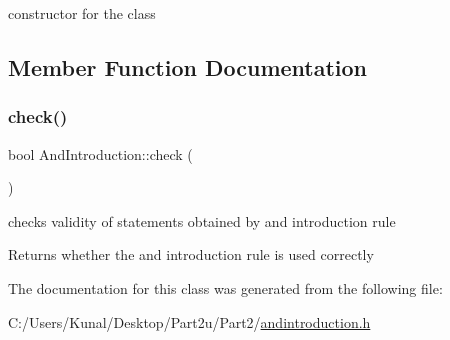 constructor for the class 



\subsection{Member Function Documentation}
\mbox{\label{class_and_introduction_a419e921533af2cd185770ec03ddf8fc5}} 
\subsubsection{\texorpdfstring{check()}{check()}}
{\footnotesize\ttfamily bool And\+Introduction\+::check (\begin{DoxyParamCaption}{ }\end{DoxyParamCaption})\hspace{0.3cm}{\ttfamily [inline]}}



checks validity of statements obtained by and introduction rule 

\begin{DoxyReturn}{Returns}
whether the and introduction rule is used correctly 
\end{DoxyReturn}


The documentation for this class was generated from the following file\+:\begin{DoxyCompactItemize}
\item 
C\+:/\+Users/\+Kunal/\+Desktop/\+Part2u/\+Part2/\mbox{\hyperlink{andintroduction_8h}{andintroduction.\+h}}\end{DoxyCompactItemize}
